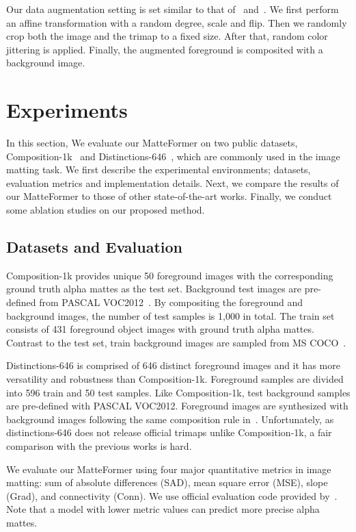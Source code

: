 \documentclass[10pt,twocolumn,letterpaper]{article}
\begin{document}
Our data augmentation setting is set similar to that of~\cite{li2020natural} and~\cite{yu2021mask}. We first perform an affine transformation with a random degree, scale and flip. Then we randomly crop both the image and the trimap to a fixed size. After that, random color jittering is applied. Finally, the augmented foreground is composited with a background image.

\section{Experiments}

In this section, We evaluate our MatteFormer on two public datasets, Composition-1k~\cite{xu2017deep} and Distinctions-646~\cite{qiao2020attention}, which are commonly used in the image matting task. We first describe the experimental environments; datasets, evaluation metrics and implementation details. Next, we compare the results of our MatteFormer to those of other state-of-the-art works. Finally, we conduct some ablation studies on our proposed method.

\subsection{Datasets and Evaluation}
Composition-1k provides unique 50 foreground images with the corresponding ground truth alpha mattes as the test set. Background test images are pre-defined from PASCAL VOC2012~\cite{everingham2010pascal}. By compositing the foreground and background images, the number of test samples is 1,000 in total. The train set consists of 431 foreground object images with ground truth alpha mattes. Contrast to the test set, train background images are sampled from MS COCO~\cite{lin2014microsoft}.

Distinctions-646 is comprised of 646 distinct foreground images and it has more versatility and robustness than Composition-1k. Foreground samples are divided into 596 train and 50 test samples. Like Composition-1k, test background samples are pre-defined with PASCAL VOC2012. Foreground images are synthesized with background images following the same composition rule in~\cite{xu2017deep}.
Unfortunately, as distinctions-646 does not release official trimaps unlike Composition-1k, a fair comparison with the previous works is hard.

We evaluate our MatteFormer using four major quantitative metrics in image matting: sum of absolute differences (SAD), mean square error (MSE), slope (Grad), and connectivity (Conn). We use official evaluation code provided by~\cite{xu2017deep}. Note that a model with lower metric values can predict more precise alpha mattes.
\end{document}
